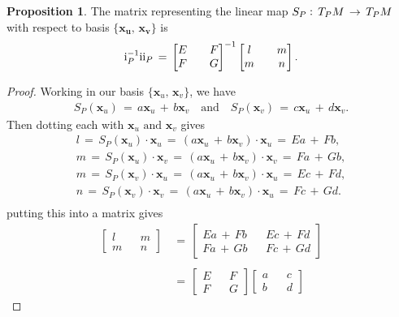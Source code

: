 \documentclass{UKZNcomp}
\newcommand{\vect}[1]{\mathbf{#1}} %
\newcommand{\RN}[1]{%
  \textup{\uppercase\expandafter{\romannumeral#1}}%
}
\theoremstyle{definition}
\newtheorem{prop}[definition]{Proposition}
\theoremstyle{remark}
\begin{document}
\begin{prop}
The matrix representing the linear map $S_P\vcentcolon\,T_PM\,\to\,T_PM$ with respect to basis $\{\vect{x_{\bm{u}}},\,\vect{x_{\bm{v}}}\}$ is
\begin{align*}
\RN{1}_P^{-1}\RN{2}_P\,=\,
\begin{bmatrix}
E && F\\
F && G
\end{bmatrix}^{-1}
\begin{bmatrix}
l && m\\
m && n
\end{bmatrix}.
\end{align*}
\end{prop}
\begin{proof}
Working in our basis $\{\vect x_u,\,\vect x_v\}$, we have
\begin{align*}
S_P(\vect x_u)\,=\,a\vect x_u\,+\,b\vect x_v\quad\text{and}\quad S_P(\vect x_v)\,=\,c\vect x_u\,+\,d\vect x_v.
\end{align*}
Then dotting each with $\vect x_u\,\,\text{and}\,\,\vect x_v$ gives
\begin{align*}
l\,=\,S_P(\vect x_u)\cdot\vect x_u\,=\,(a\vect x_u\,+\,b\vect x_v)\cdot\vect x_u\,=\,Ea\,+\,Fb,\\
m\,=\,S_P(\vect x_u)\cdot\vect x_v\,=\,(a\vect x_u\,+\,b\vect x_v)\cdot\vect x_v\,=\,Fa\,+\,Gb,\\
m\,=\,S_P(\vect x_v)\cdot\vect x_u\,=\,(a\vect x_u\,+\,b\vect x_v)\cdot\vect x_u\,=\,Ec\,+\,Fd,\\
n\,=\,S_P(\vect x_v)\cdot\vect x_v\,=\,(a\vect x_u\,+\,b\vect x_v)\cdot\vect x_u\,=\,Fc\,+\,Gd.\\
\end{align*}
putting this into a matrix gives
\begin{align*}
\begin{bmatrix}
l && m\\
m && n
\end{bmatrix}
\,&=\,
\begin{bmatrix}
Ea\,+\,Fb && Ec\,+\,Fd\\
Fa\,+\,Gb && Fc\,+\,Gd 
\end{bmatrix}\\\\
&=\,
\begin{bmatrix}
E && F\\
F && G
\end{bmatrix}
\begin{bmatrix}
a && c\\
b && d

\end{bmatrix}
\end{align*}
\end{proof}
\end{document}
